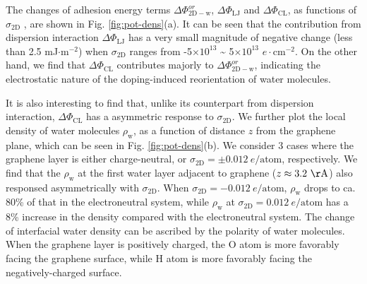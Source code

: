 \documentclass[aps,prl,reprint,groupedaddress,amsmath,amssymb, showpacs]{revtex4-1}
\begin{document}
The changes of adhesion energy terms \(\Delta
\Phi_{\mathrm{2D-w}}^{or}\), \(\Delta \Phi_{\mathrm{LJ}}\) and \(\Delta
\Phi_{\mathrm{CL}}\), as functions of \(\sigma_{\mathrm{2D}}\) , are
shown in Fig. \ref{fig:pot-dens}(a). It can be seen that the
contribution from dispersion interaction \(\Delta \Phi_{\mathrm{LJ}}\)
has a very small magnitude of negative change (less than 2.5 mJ\(\cdot
\mathrm{m}^{-2}\)) when \(\sigma_{\mathrm{2D}}\) ranges from
-5\(\times10^{13}\) \textasciitilde{} 5\(\times10^{13}\) \(e\cdot \mathrm{cm}^{-2}\). On the
other hand, we find that \(\Delta \Phi_{\mathrm{CL}}\) contributes
majorly to \(\Delta \Phi_{\mathrm{2D-w}}^{or}\), indicating the
electrostatic nature of the doping-induced reorientation of water
molecules.
\begin{center}
\end{center}
It is also interesting to find that, unlike its counterpart from
dispersion interaction, \(\Delta \Phi_{\mathrm{CL}}\) has a asymmetric
response to \(\sigma_{\mathrm{2D}}\). We further plot the local density
of water molecules \(\rho_{\mathrm{w}}\), as a function of distance \(z\)
from the graphene plane, which can be seen in Fig. \ref{fig:pot-dens}(b). We consider
3 cases where the graphene layer is either charge-neutral, or
\(\sigma_{\mathrm{2D}}=\pm 0.012\ e/ \mathrm{atom}\), respectively. We
find that the \(\rho_{\mathrm{w}}\) at the first water layer adjacent to
graphene (\(z \approx 3.2\ \mathrm{\AA}\)) also responsed asymmetrically with
\(\sigma_{\mathrm{2D}}\).  When \(\sigma_{\mathrm{2D}}=-0.012\ e/
\mathrm{atom}\), \(\rho_{\mathrm{w}}\) drops to ca. 80\% of that in the
electroneutral system, while \(\rho_{\mathrm{w}}\) at
\(\sigma_{\mathrm{2D}}=0.012\ e/ \mathrm{atom}\) has a 8\% increase in the density compared with the electroneutral system. The change of interfacial water
density can be ascribed by the polarity of water molecules. When the
graphene layer is positively charged, the O atom is more favorably
facing the graphene surface, while H atom is more favorably facing the
negatively-charged surface.
\begin{center}
\end{center}
\begin{center}
\end{center}
\end{document}
